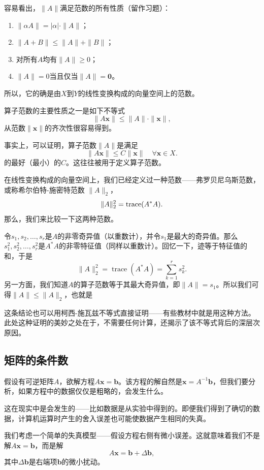 容易看出，$\|A\|$满足范数的所有性质（留作习题）：
\begin{enumerate}
    \item $\|\alpha A\|=|\alpha|\cdot\|A\|$；
    \item $\|A+B\|\leq\|A\|+\|B\|$；
    \item 对所有$A$均有$\|A\|\ge 0$；
    \item $\|A\|= 0$当且仅当$\|A\|=\mathbf{0}$。
\end{enumerate}
所以，它的确是由$X$到$Y$的线性变换构成的向量空间上的范数。

算子范数的主要性质之一是如下不等式\[\|A\mathbf{x}\|\leq\|A\|\cdot\|\mathbf{x}\|,\]
从范数$\|\mathbf{x}\|$的齐次性很容易得到。

事实上，可以证明，算子范数$\|A\|$是满足
\[\|A\mathbf{x}\|\leq C\|\mathbf{x}\|\quad\forall\mathbf{x}\in X.\]
的最好（最小）的$C$。这往往被用于定义算子范数。

在线性变换构成的向量空间上，我们已经定义过一种范数——弗罗贝尼乌斯范数，或称希尔伯特-施密特范数 $\|A\|_2$，\[\|A\|_2^2=\operatorname{trace} (A^*A).\]
那么，我们来比较一下这两种范数。

令$s_{1},s_{2},\ldots,s_{r}$是$A$的非零奇异值（以重数计），并令$s_1$是最大的奇异值。那么$s_1^2,s_2^2,\dots,s_r^2$是$A^*A$的非零特征值（同样以重数计）。回忆一下，迹等于特征值的和，于是\[\|A\|_2^2=\operatorname{trace}(A^*A)=\sum_{k=1}^rs_k^2.\]
另一方面，我们知道$A$的算子范数等于其最大奇异值，即$\|A\|=s_1$。所以我们可得$\|A\|\le\|A\|_2$，也就是
\begin{center}
\end{center}
这条结论也可以用柯西-施瓦兹不等式直接证明——有些教材中就是用这种方法。此处这种证明的美妙之处在于，不需要任何计算，还揭示了该不等式背后的深层次原因。

\subsection{矩阵的条件数}

假设有可逆矩阵$A$，欲解方程$A\mathbf{x}=\mathbf{b}$。该方程的解自然是$\mathbf{x}=A^{-1}\mathbf{b}$，但我们要分析，如果方程中的数据仅仅是粗略的，会发生什么。

这在现实中是会发生的——比如数据是从实验中得到的。即便我们得到了确切的数据，计算机运算时产生的舍入误差也可能使数据产生相同的失真。

我们考虑一个简单的失真模型——假设方程右侧有微小误差。这就意味着我们不是解$A\mathbf{x}=\mathbf{b}$，而是解\[A\mathbf{x}=\mathbf{b}+\Delta\mathbf{b},\]
其中$\Delta\mathbf{b}$是右端项$\mathbf{b}$的微小扰动。


